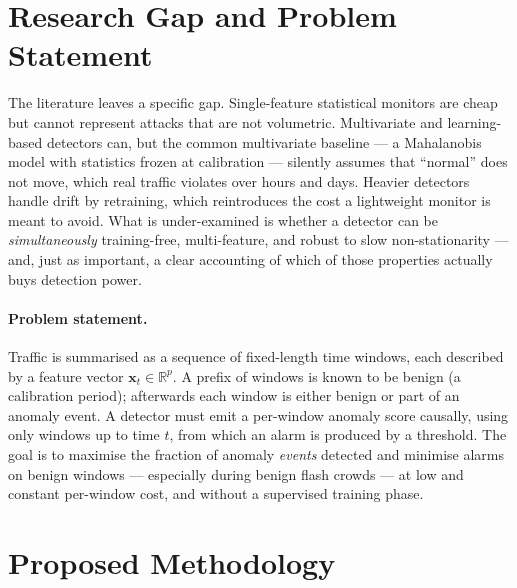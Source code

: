 \documentclass[11pt,a4paper]{article}
\begin{document}
\section{Research Gap and Problem Statement}
The literature leaves a specific gap. Single-feature statistical monitors are
cheap but cannot represent attacks that are not volumetric. Multivariate and
learning-based detectors can, but the common multivariate baseline --- a
Mahalanobis model with statistics frozen at calibration --- silently assumes that
``normal'' does not move, which real traffic violates over hours and days. Heavier
detectors handle drift by retraining, which reintroduces the cost a lightweight
monitor is meant to avoid. What is under-examined is whether a detector can be
\emph{simultaneously} training-free, multi-feature, and robust to slow
non-stationarity --- and, just as important, a clear accounting of which of those
properties actually buys detection power.

\paragraph{Problem statement.} Traffic is summarised as a sequence of
fixed-length time windows, each described by a feature vector
$\mathbf{x}_t\in\mathbb{R}^{p}$. A prefix of windows is known to be benign (a
calibration period); afterwards each window is either benign or part of an anomaly
event. A detector must emit a per-window anomaly score causally, using only
windows up to time $t$, from which an alarm is produced by a threshold. The goal
is to maximise the fraction of anomaly \emph{events} detected and minimise alarms
on benign windows --- especially during benign flash crowds --- at low and
constant per-window cost, and without a supervised training phase.

\section{Proposed Methodology}
\end{document}
